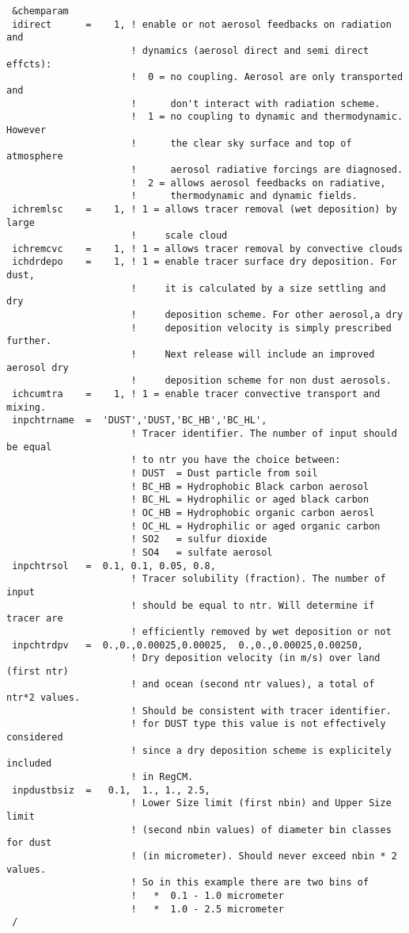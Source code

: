 {\footnotesize
\begin{Verbatim}
 &chemparam
 idirect      =    1, ! enable or not aerosol feedbacks on radiation and
                      ! dynamics (aerosol direct and semi direct effcts):
                      !  0 = no coupling. Aerosol are only transported and
                      !      don't interact with radiation scheme.
                      !  1 = no coupling to dynamic and thermodynamic. However
                      !      the clear sky surface and top of atmosphere
                      !      aerosol radiative forcings are diagnosed.
                      !  2 = allows aerosol feedbacks on radiative,
                      !      thermodynamic and dynamic fields.
 ichremlsc    =    1, ! 1 = allows tracer removal (wet deposition) by large
                      !     scale cloud
 ichremcvc    =    1, ! 1 = allows tracer removal by convective clouds
 ichdrdepo    =    1, ! 1 = enable tracer surface dry deposition. For dust,
                      !     it is calculated by a size settling and dry
                      !     deposition scheme. For other aerosol,a dry
                      !     deposition velocity is simply prescribed further.
                      !     Next release will include an improved aerosol dry
                      !     deposition scheme for non dust aerosols.
 ichcumtra    =    1, ! 1 = enable tracer convective transport and mixing.
 inpchtrname  =  'DUST','DUST,'BC_HB','BC_HL',
                      ! Tracer identifier. The number of input should be equal
                      ! to ntr you have the choice between: 
                      ! DUST  = Dust particle from soil
                      ! BC_HB = Hydrophobic Black carbon aerosol
                      ! BC_HL = Hydrophilic or aged black carbon
                      ! OC_HB = Hydrophobic organic carbon aerosl
                      ! OC_HL = Hydrophilic or aged organic carbon
                      ! SO2   = sulfur dioxide
                      ! SO4   = sulfate aerosol
 inpchtrsol   =  0.1, 0.1, 0.05, 0.8,
                      ! Tracer solubility (fraction). The number of input
                      ! should be equal to ntr. Will determine if tracer are
                      ! efficiently removed by wet deposition or not
 inpchtrdpv   =  0.,0.,0.00025,0.00025,  0.,0.,0.00025,0.00250,
                      ! Dry deposition velocity (in m/s) over land (first ntr)
                      ! and ocean (second ntr values), a total of ntr*2 values.
                      ! Should be consistent with tracer identifier.
                      ! for DUST type this value is not effectively considered
                      ! since a dry deposition scheme is explicitely included
                      ! in RegCM.
 inpdustbsiz  =   0.1,  1., 1., 2.5,
                      ! Lower Size limit (first nbin) and Upper Size limit
                      ! (second nbin values) of diameter bin classes for dust
                      ! (in micrometer). Should never exceed nbin * 2 values.
                      ! So in this example there are two bins of
                      !   *  0.1 - 1.0 micrometer
                      !   *  1.0 - 2.5 micrometer
 /
\end{Verbatim}
}

